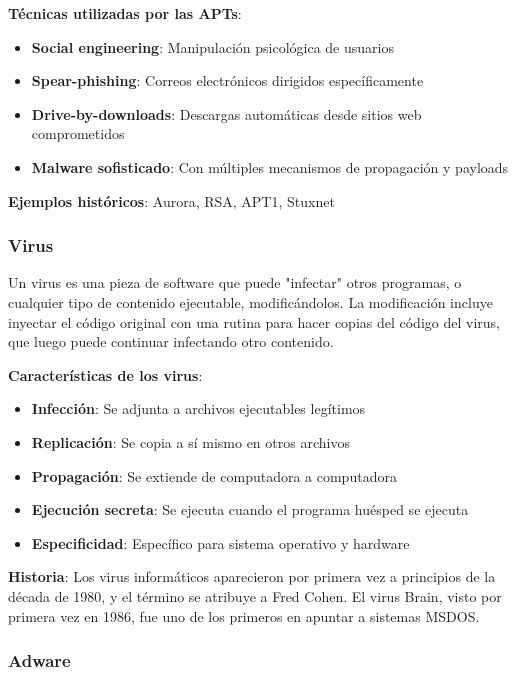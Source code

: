 \textbf{Técnicas utilizadas por las APTs}:
\begin{itemize}
    \item \textbf{Social engineering}: Manipulación psicológica de usuarios
    \item \textbf{Spear-phishing}: Correos electrónicos dirigidos específicamente
    \item \textbf{Drive-by-downloads}: Descargas automáticas desde sitios web comprometidos
    \item \textbf{Malware sofisticado}: Con múltiples mecanismos de propagación y payloads
\end{itemize}

\textbf{Ejemplos históricos}: Aurora, RSA, APT1, Stuxnet

\subsubsection{Virus}

Un virus es una pieza de software que puede "infectar" otros programas, o cualquier tipo de contenido ejecutable, modificándolos. La modificación incluye inyectar el código original con una rutina para hacer copias del código del virus, que luego puede continuar infectando otro contenido.

\textbf{Características de los virus}:
\begin{itemize}
    \item \textbf{Infección}: Se adjunta a archivos ejecutables legítimos
    \item \textbf{Replicación}: Se copia a sí mismo en otros archivos
    \item \textbf{Propagación}: Se extiende de computadora a computadora
    \item \textbf{Ejecución secreta}: Se ejecuta cuando el programa huésped se ejecuta
    \item \textbf{Especificidad}: Específico para sistema operativo y hardware
\end{itemize}

\textbf{Historia}: Los virus informáticos aparecieron por primera vez a principios de la década de 1980, y el término se atribuye a Fred Cohen. El virus Brain, visto por primera vez en 1986, fue uno de los primeros en apuntar a sistemas MSDOS.

\subsubsection{Adware}

